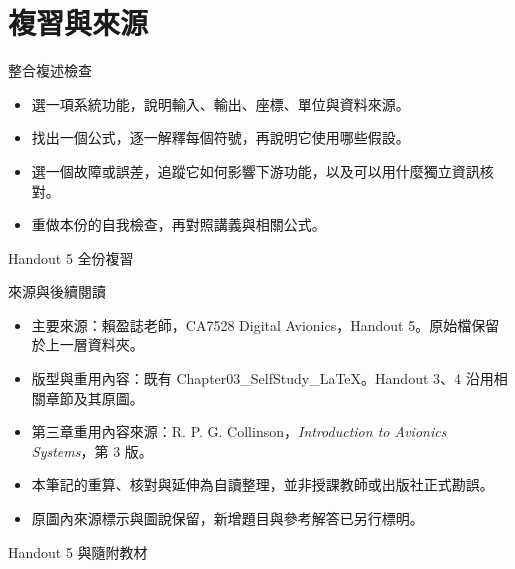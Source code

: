\documentclass[aspectratio=169,11pt]{beamer}
\newcommand{\src}[1]{\par\vfill{\scriptsize\color{teal}#1}}
\newcommand{\slide}[3]{\begin{frame}[t]{#1}#3\src{#2}\end{frame}}
\newcommand{\bi}{\begin{itemize}\setlength{\itemsep}{5pt}}
\newcommand{\ei}{\end{itemize}}
\begin{document}
\section{複習與來源}
\slide{整合複述檢查}{Handout 5 全份複習}{
\bi
\item 選一項系統功能，說明輸入、輸出、座標、單位與資料來源。
\item 找出一個公式，逐一解釋每個符號，再說明它使用哪些假設。
\item 選一個故障或誤差，追蹤它如何影響下游功能，以及可以用什麼獨立資訊核對。
\item 重做本份的自我檢查，再對照講義與相關公式。
\ei
}
\slide{來源與後續閱讀}{Handout 5 與隨附教材}{
\small
\bi
\item 主要來源：賴盈誌老師，CA7528 Digital Avionics，Handout 5。原始檔保留於上一層資料夾。
\item 版型與重用內容：既有 Chapter03\_SelfStudy\_LaTeX。Handout 3、4 沿用相關章節及其原圖。
\item 第三章重用內容來源：R. P. G. Collinson，\textit{Introduction to Avionics Systems}，第 3 版。
\item 本筆記的重算、核對與延伸為自讀整理，並非授課教師或出版社正式勘誤。
\item 原圖內來源標示與圖說保留，新增題目與參考解答已另行標明。
\ei
}
\end{document}
